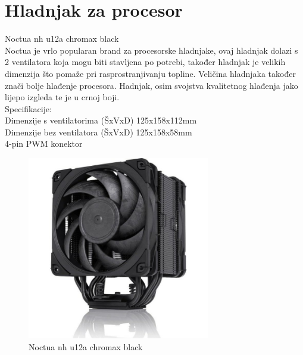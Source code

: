 \documentclass{report}
\begin{document}
\chapter{Hladnjak za procesor}
Noctua nh u12a chromax black
\\Noctua je vrlo popularan brand za procesorske hladnjake, ovaj hladnjak dolazi s 2 ventilatora koja mogu biti stavljena po potrebi, također hladnjak je velikih dimenzija što pomaže pri rasprostranjivanju topline. Veličina hladnjaka također znači bolje hlađenje procesora. Hadnjak, osim svojstva kvalitetnog hlađenja jako lijepo izgleda te je u crnoj boji.
\\Specifikacije:
\\Dimenzije s ventilatorima (ŠxVxD) 125x158x112mm
\\Dimenzije bez ventilatora (ŠxVxD) 125x158x58mm
\\4-pin PWM konektor
\begin{figure}[h]
\includegraphics[width=8cm]{Hladnjak za procesor.jpg}
\caption{Noctua nh u12a chromax black}
\end{figure}
\end{document}
